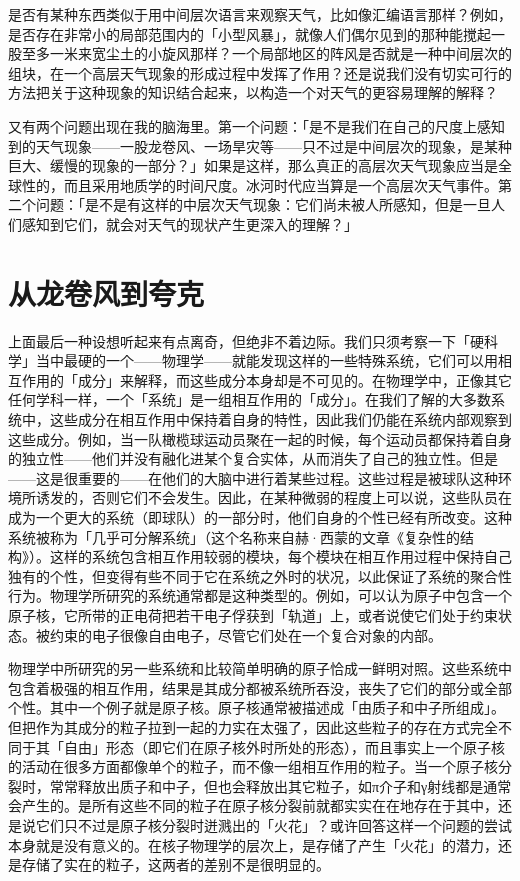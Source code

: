 \documentclass[
  12pt,
  twoside,
  openright,
  oldfontcommands,
]{memoir}
\begin{document}
是否有某种东西类似于用中间层次语言来观察天气，比如像汇编语言那样？例如，是否存在非常小的局部范围内的「小型风暴」，就像人们偶尔见到的那种能搅起一股至多一米来宽尘土的小旋风那样？一个局部地区的阵风是否就是一种中间层次的组块，在一个高层天气现象的形成过程中发挥了作用？还是说我们没有切实可行的方法把关于这种现象的知识结合起来，以构造一个对天气的更容易理解的解释？

又有两个问题出现在我的脑海里。第一个问题：「是不是我们在自己的尺度上感知到的天气现象------一股龙卷风、一场旱灾等------只不过是中间层次的现象，是某种巨大、缓慢的现象的一部分？」如果是这样，那么真正的高层次天气现象应当是全球性的，而且采用地质学的时间尺度。冰河时代应当算是一个高层次天气事件。第二个问题：「是不是有这样的中层次天气现象：它们尚未被人所感知，但是一旦人们感知到它们，就会对天气的现状产生更深入的理解？」

\section{从龙卷风到夸克}

上面最后一种设想听起来有点离奇，但绝非不着边际。我们只须考察一下「硬科学」当中最硬的一个------物理学------就能发现这样的一些特殊系统，它们可以用相互作用的「成分」来解释，而这些成分本身却是不可见的。在物理学中，正像其它任何学科一样，一个「系统」是一组相互作用的「成分」。在我们了解的大多数系统中，这些成分在相互作用中保持着自身的特性，因此我们仍能在系统内部观察到这些成分。例如，当一队橄榄球运动员聚在一起的时候，每个运动员都保持着自身的独立性------他们并没有融化进某个复合实体，从而消失了自己的独立性。但是------这是很重要的------在他们的大脑中进行着某些过程。这些过程是被球队这种环境所诱发的，否则它们不会发生。因此，在某种微弱的程度上可以说，这些队员在成为一个更大的系统（即球队）的一部分时，他们自身的个性已经有所改变。这种系统被称为「几乎可分解系统」（这个名称来自赫·西蒙的文章《复杂性的结构》）。这样的系统包含相互作用较弱的模块，每个模块在相互作用过程中保持自己独有的个性，但变得有些不同于它在系统之外时的状况，以此保证了系统的聚合性行为。物理学所研究的系统通常都是这种类型的。例如，可以认为原子中包含一个原子核，它所带的正电荷把若干电子俘获到「轨道」上，或者说使它们处于约束状态。被约束的电子很像自由电子，尽管它们处在一个复合对象的内部。

物理学中所研究的另一些系统和比较简单明确的原子恰成一鲜明对照。这些系统中包含着极强的相互作用，结果是其成分都被系统所吞没，丧失了它们的部分或全部个性。其中一个例子就是原子核。原子核通常被描述成「由质子和中子所组成」。但把作为其成分的粒子拉到一起的力实在太强了，因此这些粒子的存在方式完全不同于其「自由」形态（即它们在原子核外时所处的形态），而且事实上一个原子核的活动在很多方面都像单个的粒子，而不像一组相互作用的粒子。当一个原子核分裂时，常常释放出质子和中子，但也会释放出其它粒子，如π介子和γ射线都是通常会产生的。是所有这些不同的粒子在原子核分裂前就都实实在在地存在于其中，还是说它们只不过是原子核分裂时迸溅出的「火花」？或许回答这样一个问题的尝试本身就是没有意义的。在核子物理学的层次上，是存储了产生「火花」的潜力，还是存储了实在的粒子，这两者的差别不是很明显的。
\end{document}
